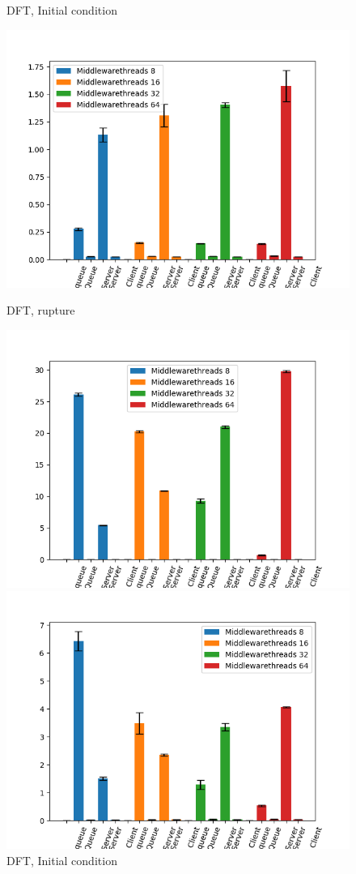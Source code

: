 \documentclass[11pt,a4paper]{article}
\begin{document}
\begin{figure}[H]
\begin{minipage}[b]{0.5\linewidth}
    \caption{DFT, Initial condition} 
    \vspace{4ex}
  \end{minipage}%
  \begin{minipage}[b]{0.5\linewidth}
    \centering
    \includegraphics[width=0.7\linewidth]{img/exp3_2/exp3_2_mw_percentile_plots_writes_1__vc_4.png} 
    \caption{DFT, rupture} 
    \vspace{4ex}
  \end{minipage} 
    \begin{minipage}[b]{0.5\linewidth}
    \centering
    \includegraphics[width=0.7\linewidth]{img/exp3_2/exp3_2_mw_percentile_plots_writes_0__vc_16.png} 
    \caption{DFT, Initial condition} 
    \vspace{4ex}
  \end{minipage}%
  \begin{minipage}[b]{0.5\linewidth}
    \centering
    \includegraphics[width=0.7\linewidth]{img/exp3_2/exp3_2_mw_percentile_plots_writes_1__vc_16.png} 

\end{minipage}
\end{figure}
\end{document}
